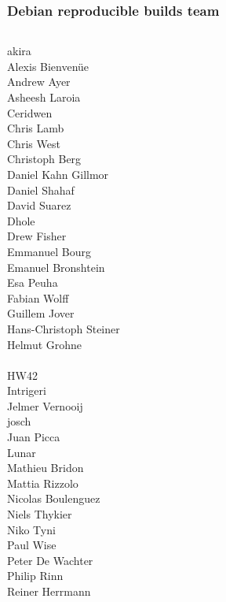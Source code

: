 \documentclass[14pt,aspectratio=169]{beamer}
\newif\ifplacelogo
\begin{document}
\placelogotrue

\begin{frame}
 \frametitle{Debian reproducible builds team}
 \begin{center}
  \begin{columns}
   \footnotesize
    {akira} \\
    {Alexis Bienvenüe} \\
    {Andrew Ayer} \\
    {Asheesh Laroia} \\
    {Ceridwen} \\
    {Chris Lamb} \\
    {Chris West} \\
    {Christoph Berg} \\
    {Daniel Kahn Gillmor} \\
    {Daniel Shahaf} \\
    David Suarez \\
    {Dhole} \\
    Drew Fisher \\
    Emmanuel Bourg \\
    Emanuel Bronshtein \\
    Esa Peuha \\
    {Fabian Wolff} \\
    {Guillem Jover} \\
    Hans-Christoph Steiner \\
    {Helmut Grohne} \\
     \\
    HW42 \\
    Intrigeri \\
    {Jelmer Vernooij} \\
    {josch} \\
    Juan Picca \\
    {Lunar} \\
    Mathieu Bridon \\
    {Mattia Rizzolo} \\
    Nicolas Boulenguez \\
    {Niels Thykier} \\
    Niko Tyni \\
    {Paul Wise} \\
    Peter De Wachter \\
    Philip Rinn \\
    {Reiner Herrmann} \\

\end{columns}
\end{center}
\end{frame}
\end{document}
